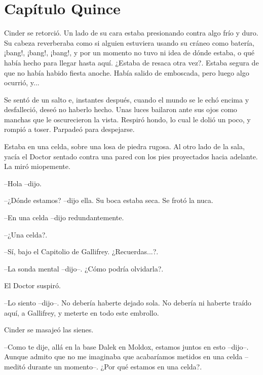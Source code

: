 \chapter*{Capítulo Quince}




Cinder se retorció. Un lado de su cara estaba presionando contra algo frío y duro. Su cabeza reverberaba como si alguien estuviera usando su cráneo como batería, ¡bang!, ¡bang!, ¡bang!, y por un momento no tuvo ni idea de dónde estaba, o qué había hecho para llegar hasta aquí. ¿Estaba de resaca otra vez?. Estaba segura de que no había habido fiesta anoche. Había salido de emboscada, pero luego algo ocurrió, y...

Se sentó de un salto e, instantes después, cuando el mundo se le echó encima y desfalleció, deseó no haberlo hecho. Unas luces bailaron ante sus ojos como manchas que le oscurecieron la vista. Respiró hondo, lo cual le dolió un poco, y rompió a toser. Parpadeó para despejarse.

Estaba en una celda, sobre una losa de piedra rugosa. Al otro lado de la sala, yacía el Doctor sentado contra una pared con los pies proyectados hacia adelante. La miró miopemente.



--Hola --dijo.



--¿Dónde estamos? --dijo ella. Su boca estaba seca. Se frotó la nuca.



--En una celda --dijo redundantemente.



--¿Una celda?.



--Sí, bajo el Capitolio de Gallifrey. ¿Recuerdas...?.



--La sonda mental --dijo--. ¿Cómo podría olvidarla?.



El Doctor suspiró.



--Lo siento --dijo--. No debería haberte dejado sola. No debería ni haberte traído aquí, a Gallifrey, y meterte en todo este embrollo.



Cinder se masajeó las sienes.



--Como te dije, allá en la base Dalek en Moldox, estamos juntos en esto --dijo--. Aunque admito que no me imaginaba que acabaríamos metidos en una celda --meditó durante un momento--. ¿Por qué estamos en una celda?.



